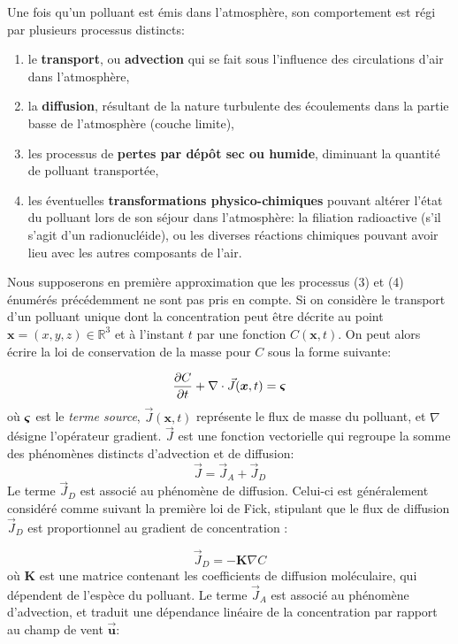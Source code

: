 	Une fois qu'un polluant est émis dans l'atmosphère, son comportement est régi par plusieurs processus distincts:\\
	\begin{enumerate}
		\item le \textbf{transport}, ou \textbf{advection} qui se fait sous l'influence des circulations d'air dans l'atmosphère,
		\item la \textbf{diffusion}, résultant de la nature turbulente des écoulements dans la partie basse de l'atmosphère (couche limite),
		\item les processus de \textbf{pertes par dépôt sec ou humide}, diminuant la quantité de polluant transportée,
		\item les éventuelles \textbf{transformations physico-chimiques} pouvant altérer l'état du polluant lors de son séjour dans l'atmosphère: la filiation radioactive (s'il s'agit d'un radionucléide), ou les diverses réactions chimiques pouvant avoir lieu avec les autres composants de l'air.\\
	\end{enumerate}
	
	Nous supposerons en première approximation que les processus (3) et (4) énumérés précédemment ne sont pas pris en compte. Si on considère le transport d'un polluant unique dont la concentration peut être décrite au point $\bm{x} = (x,y,z) \in \mathbb{R}^3$ et à l'instant $t$ par une fonction $C(\bm{x},t)$. On peut alors écrire la loi de conservation de la masse pour $C$ sous la forme suivante:
	
	\begin{equation}
	\label{eqn_conservation_masse}
		\dfrac{\partial C}{\partial t} + \nabla \cdot \vec{J}(\bm{x},t) = {\bm{\varsigma}}
	\end{equation}
	où ${\bm{\varsigma}}$ est le \textit{terme source}, $\vec{J}(\bm{x},t)$ représente le flux de masse du polluant, et $\nabla$ désigne l'opérateur gradient. $\vec{J}$ est une fonction vectorielle qui regroupe la somme des phénomènes distincts d'advection et de diffusion: 
	\begin{equation}
	\label{eqn_somme_flux}
	\vec{J} = \vec{J}_A + \vec{J}_D
	\end{equation}
	Le terme $\vec{J}_D$ est associé au phénomène de diffusion. Celui-ci est généralement considéré comme suivant la première loi de Fick, stipulant que le flux de diffusion $\vec{J}_D$ est proportionnel au gradient de concentration : 
	
	\begin{equation}
	\label{eqn_fick_diffusion}
	\vec{J}_D = - \bm{K}\nabla C
	\end{equation}
	où $\bm{K}$ est une matrice contenant les coefficients de diffusion moléculaire, qui dépendent de l'espèce du polluant. Le terme $\vec{J}_A$ est associé au phénomène d'advection, et traduit une dépendance linéaire de la concentration par rapport au champ de vent $\bm{\vec{u}}$:
	
